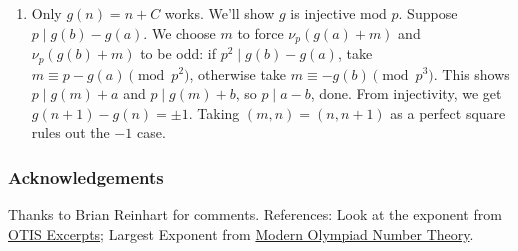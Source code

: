\documentclass[11pt,paper=letter]{scrartcl}
\begin{document}
\begin{enumerate}
\item Only $g(n) = n + C$ works. We'll show $g$ is injective mod $p$. Suppose $p \mid g(b) - g(a)$. We choose $m$ to force $\nu_p(g(a) + m)$ and $\nu_p(g(b) + m)$ to be odd: if $p^2 \mid g(b) - g(a)$, take $m \equiv p - g(a) \pmod{p^2}$, otherwise take $m \equiv -g(b) \pmod{p^3}$. This shows $p \mid g(m) + a$ and $p \mid g(m) + b$, so $p \mid a - b$, done. From injectivity, we get $g(n + 1) - g(n) = \pm 1$. Taking $(m, n) = (n, n + 1)$ as a perfect square rules out the $-1$ case.

\end{enumerate}

\subsubsection*{Acknowledgements}

Thanks to Brian Reinhart for comments. References: Look at the exponent from \href{https://web.evanchen.cc/textbooks/OTIS-Excerpts.pdf}{OTIS Excerpts}; Largest Exponent from \href{https://artofproblemsolving.com/community/c6h2344755}{Modern Olympiad Number Theory}.
\end{document}
